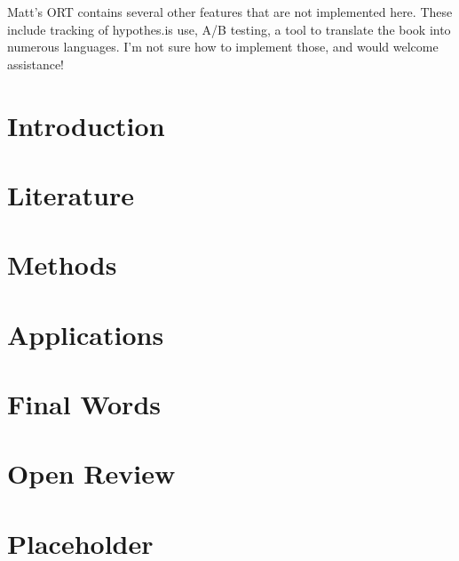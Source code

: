 \documentclass[]{book}
\begin{document}
Matt's ORT contains several other features that are not implemented
here. These include tracking of hypothes.is use, A/B testing, a tool to
translate the book into numerous languages. I'm not sure how to
implement those, and would welcome assistance!

\chapter{Introduction}\label{intro}

\chapter{Literature}\label{literature}

\chapter{Methods}\label{methods}

\chapter{Applications}\label{applications}

\chapter{Final Words}\label{final-words}

\chapter{Open Review}\label{open-review}

\chapter{Placeholder}\label{placeholder}


\end{document}
